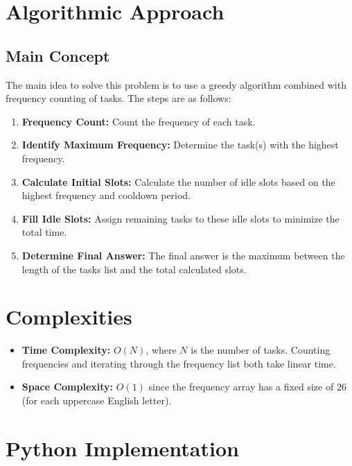 \section*{Algorithmic Approach}

\subsection*{Main Concept}
The main idea to solve this problem is to use a greedy algorithm combined with frequency counting of tasks. The steps are as follows:

\begin{enumerate}
    \item \textbf{Frequency Count:} Count the frequency of each task.
    \item \textbf{Identify Maximum Frequency:} Determine the task(s) with the highest frequency.
    \item \textbf{Calculate Initial Slots:} Calculate the number of idle slots based on the highest frequency and cooldown period.
    \item \textbf{Fill Idle Slots:} Assign remaining tasks to these idle slots to minimize the total time.
    \item \textbf{Determine Final Answer:} The final answer is the maximum between the length of the tasks list and the total calculated slots.
\end{enumerate}


\section*{Complexities}

\begin{itemize}
	\item \textbf{Time Complexity:} \( O(N) \), where \( N \) is the number of tasks. Counting frequencies and iterating through the frequency list both take linear time.
	\item \textbf{Space Complexity:} \( O(1) \) since the frequency array has a fixed size of 26 (for each uppercase English letter).
\end{itemize}

\newpage
\section*{Python Implementation}


